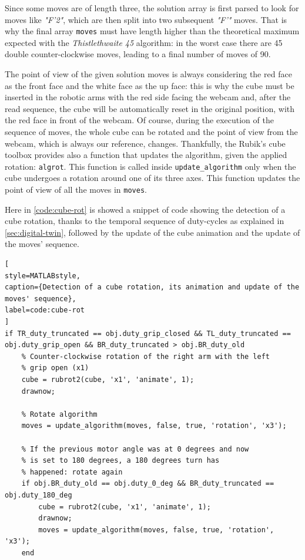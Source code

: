 \documentclass{report}
\begin{document}
Since some moves are of length three, the solution array is first parsed to look for moves like \textit{"F'2"}, which are then split into two subsequent \textit{"F'"} moves. That is why the final array \texttt{moves} must have length higher than the theoretical maximum expected with the \textit{Thistlethwaite 45} algorithm: in the worst case there are 45 double counter-clockwise moves, leading to a final number of moves of 90.

\medskip

The point of view of the given solution moves is always considering the red face as the front face and the white face as the up face: this is why the cube must be inserted in the robotic arms with the red side facing the webcam and, after the read sequence, the cube will be automatically reset in the original position, with the red face in front of the webcam. Of course, during the execution of the sequence of moves, the whole cube can be rotated and the point of view from the webcam, which is always our reference, changes. Thankfully, the Rubik's cube toolbox provides also a function that updates the algorithm, given the applied rotation: \texttt{algrot}. This function is called inside \texttt{update\_algorithm} only when the cube undergoes a rotation around one of its three axes. This function updates the point of view of all the moves in \texttt{moves}.

Here in \ref{code:cube-rot} is showed a snippet of code showing the detection of a cube rotation, thanks to the temporal sequence of duty-cycles as explained in \ref{sec:digital-twin}, followed by the update of the cube animation and the update of the moves' sequence.

\begin{lstlisting}[
style=MATLABstyle,
caption={Detection of a cube rotation, its animation and update of the moves' sequence},
label=code:cube-rot
]
if TR_duty_truncated == obj.duty_grip_closed && TL_duty_truncated == obj.duty_grip_open && BR_duty_truncated > obj.BR_duty_old
    % Counter-clockwise rotation of the right arm with the left
    % grip open (x1)
    cube = rubrot2(cube, 'x1', 'animate', 1);
    drawnow;
    
    % Rotate algorithm
    moves = update_algorithm(moves, false, true, 'rotation', 'x3');
    
    % If the previous motor angle was at 0 degrees and now
    % is set to 180 degrees, a 180 degrees turn has
    % happened: rotate again
    if obj.BR_duty_old == obj.duty_0_deg && BR_duty_truncated == obj.duty_180_deg
        cube = rubrot2(cube, 'x1', 'animate', 1);
        drawnow;
        moves = update_algorithm(moves, false, true, 'rotation', 'x3');
    end
\end{lstlisting}
\end{document}
